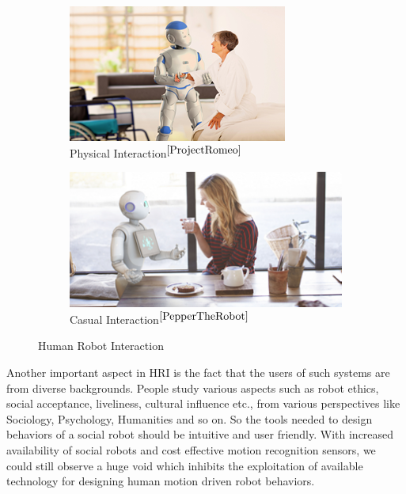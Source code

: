 \documentclass{llncs}
\begin{document}
\begin{figure}
\begin{subfigure}[t]{0.45\textwidth}
\includegraphics[width=\textwidth]{../thesis/assets/romeo_interaction.png}
\caption[Human Robot Interaction]{Physical Interaction$^{\cite{ProjectRomeo}}$ }
\end{subfigure}
\begin{subfigure}[t]{0.45\textwidth}
\includegraphics[width=\textwidth]{../thesis/assets/pepper_interaction.png}
\caption[Human Robot Interaction]{Casual Interaction$^{\cite{PepperTheRobot}}$ }
\end{subfigure}
\caption[Human Robot Interaction]{Human Robot Interaction}
\label{fig:hri}
\end{figure}

Another important aspect in HRI is the fact that the users of such systems are from diverse backgrounds. People study various aspects such as robot ethics, social acceptance, liveliness, cultural influence etc., from various perspectives like Sociology, Psychology, Humanities and so on. So the tools needed to design behaviors of a social robot should be intuitive and user friendly.  With increased availability of social robots and cost effective motion recognition sensors, we could still observe a huge void which inhibits the exploitation of available technology for designing human motion driven robot behaviors.
\end{document}

